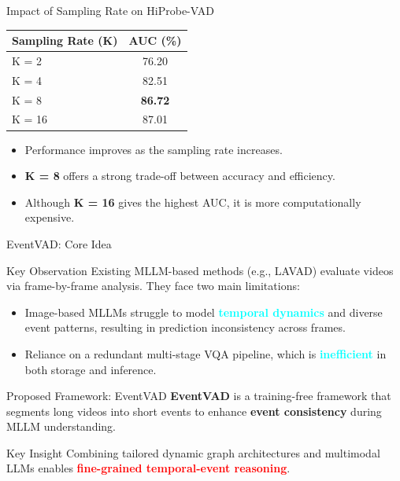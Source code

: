 \documentclass[aspectratio=169,xcolor=dvipsnames]{beamer}
\begin{document}
	
	
	\begin{frame}{Impact of Sampling Rate on HiProbe-VAD}
		\centering
		\small
		
		\vspace{1em}
		
		\renewcommand{\arraystretch}{1.2}
		\begin{tabular}{lc}
			\hline
			\textbf{Sampling Rate (K)} & \textbf{AUC (\%)} \\
			\hline
			K = 2  & 76.20 \\
			K = 4  & 82.51 \\
			K = 8  & \textbf{86.72} \\
			K = 16 & 87.01 \\
			\hline
		\end{tabular}
		
		\vspace{1em}
		
		\begin{itemize}
			\item Performance improves as the sampling rate increases.
			\item \textbf{K = 8} offers a strong trade-off between accuracy and efficiency.
			\item Although \textbf{K = 16} gives the highest AUC, it is more computationally expensive.
		\end{itemize}
	\end{frame}
	
	
	
	\begin{frame}{EventVAD: Core Idea}
		\small
		
		\begin{block}{Key Observation}
			Existing MLLM-based methods (e.g., LAVAD) evaluate videos via frame-by-frame analysis. They face two main limitations:
			\begin{itemize}
				\item Image-based MLLMs struggle to model \textbf{\textcolor{cyan}{temporal dynamics}} and diverse event patterns, resulting in prediction inconsistency across frames.
				\item Reliance on a redundant multi-stage VQA pipeline, which is \textbf{\textcolor{cyan}{inefficient}} in both storage and inference.
			\end{itemize}
		\end{block}
		
		\begin{alertblock}{Proposed Framework: EventVAD}
			\textbf{EventVAD} is a training-free framework that segments long videos into short events to enhance \textbf{event consistency} during MLLM understanding.
		\end{alertblock}
		
		\begin{block}{Key Insight}
			Combining tailored dynamic graph architectures and multimodal LLMs enables \textbf{\textcolor{red}{fine-grained temporal-event reasoning}}.
		\end{block}
	\end{frame}
	
\end{document}
